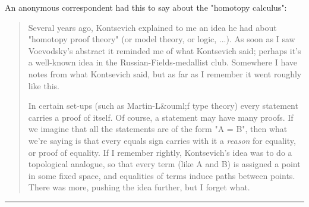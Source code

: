 An anonymous correspondent had this to say 
about the "homotopy \lambda  calculus":

\begin{quote}
 Several years ago, Kontsevich explained
 to me an idea he had about "homotopy proof theory" (or model theory, or
 logic, ...).  As soon as I saw Voevodsky's abstract it reminded me of
 what Kontsevich said; perhaps it's a well-known idea in the
 Russian-Fields-medallist club.  Somewhere I have notes from what
 Kontsevich said, but as far as I remember it went roughly like this.  
 
 In certain set-ups (such as Martin-L&ouml;f type theory) every statement
 carries a proof of itself.  Of course, a statement may have many proofs.
 If we imagine that all the statements are of the form "A = B", then what
 we're saying is that every equals sign carries with it a \emph{reason} for
 equality, or proof of equality.  If I remember rightly, Kontsevich's
 idea was to do a topological analogue, so that every term (like A and B)
 is assigned a point in some fixed space, and equalities of terms induce
 paths between points.  There was more, pushing the idea further, but I
 forget what.  
\end{quote}


\par\noindent\rule{\textwidth}{0.4pt}
